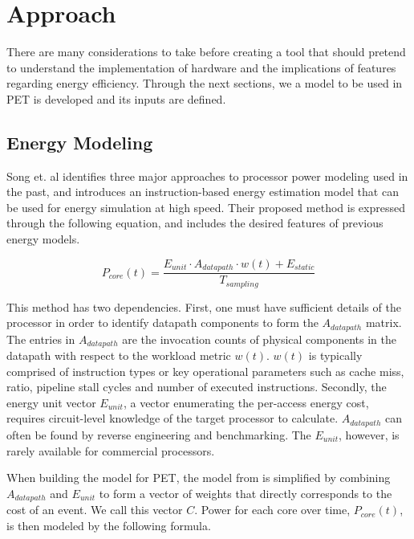 \section{Approach}

There are many considerations to take before creating a tool that should pretend
to understand the implementation of hardware and the implications of features
regarding energy efficiency. Through the next sections, we a model to be
used in PET is developed and its inputs are defined.


\subsection{Energy Modeling}

Song et. al \cite{song2012instruction} identifies three major approaches to
processor power modeling used in the past, and introduces an instruction-based
energy estimation model that can be used for energy simulation at high speed.
Their proposed method is expressed through the following equation, and includes
the desired features of previous energy models.

\begin{equation}
    P_{core}(t) = \frac{E_{unit} \cdot A_{datapath} \cdot w(t) +
    E_{static}}{T_{sampling}}
\end{equation}

This method has two dependencies. First, one must have sufficient details of the
processor in order to identify datapath components to form the $A_{datapath}$
matrix. The entries in $A_{datapath}$ are the invocation counts of physical
components in the datapath with respect to the workload metric $w(t)$. $w(t)$ is
typically comprised of instruction types or key operational parameters such as
cache miss, ratio, pipeline stall cycles and number of executed instructions.
Secondly, the energy unit vector $E_{unit}$, a vector enumerating the per-access
energy cost, requires circuit-level knowledge of the target processor to
calculate. $A_{datapath}$ can often be found by reverse engineering and
benchmarking. The $E_{unit}$, however, is rarely available for commercial
processors.

When building the model for PET, the model from \cite{song2012instruction} is
simplified by combining $A_{datapath}$ and $E_{unit}$ to form a vector of
weights that directly corresponds to the cost of an event. We call this vector
$C$. Power for each core over time, $P_{core}(t)$, is then modeled by the
following formula.

